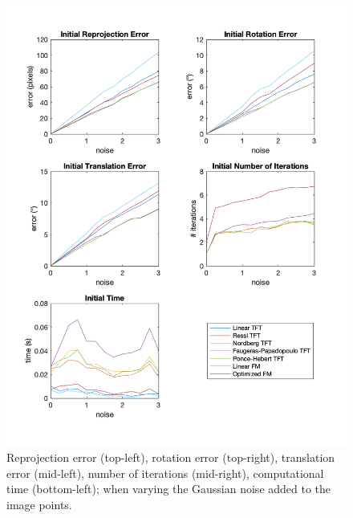 \begin{figure}[p]
	\centering
	\includegraphics[width=1\textwidth]{Experiments/Synthetic/noise/INITnoisePlots.png}
	\caption{Reprojection error (top-left), rotation error (top-right), translation error (mid-left), number of iterations (mid-right), computational time (bottom-left); when varying the Gaussian noise added to the image points.}
\end{figure}

